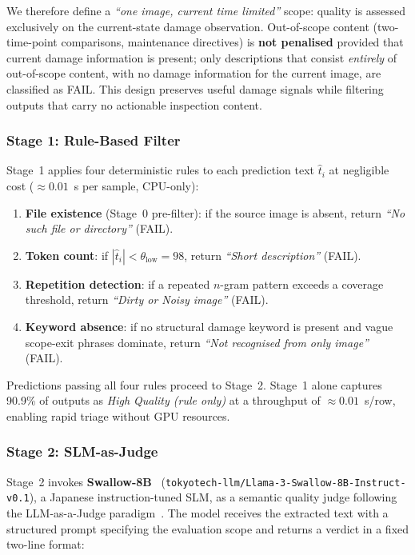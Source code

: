 \documentclass[twocolumn]{article}
\begin{document}
We therefore define a \textit{``one image, current time limited''} scope:
quality is assessed exclusively on the current-state damage observation.
Out-of-scope content (two-time-point comparisons, maintenance directives)
is \textbf{not penalised} provided that current damage information is present;
only descriptions that consist \textit{entirely} of out-of-scope content,
with no damage information for the current image, are classified as FAIL.
This design preserves useful damage signals while filtering outputs that
carry no actionable inspection content.

\subsubsection{Stage 1: Rule-Based Filter}
\label{sec:guard_stage1}

Stage~1 applies four deterministic rules to each prediction text $\hat{t}_i$
at negligible cost (${\approx}0.01$~s per sample, CPU-only):

\begin{enumerate}[leftmargin=*,itemsep=1pt]
  \item \textbf{File existence} (Stage~0 pre-filter): if the source image is
        absent, return \textit{``No such file or directory''} (FAIL).
  \item \textbf{Token count}: if $|\hat{t}_i| < \theta_{\text{low}} = 98$,
        return \textit{``Short description''} (FAIL).
  \item \textbf{Repetition detection}: if a repeated $n$-gram pattern exceeds
        a coverage threshold, return \textit{``Dirty or Noisy image''} (FAIL).
  \item \textbf{Keyword absence}: if no structural damage keyword is present
        and vague scope-exit phrases dominate, return
        \textit{``Not recognised from only image''} (FAIL).
\end{enumerate}

Predictions passing all four rules proceed to Stage~2.
Stage~1 alone captures 90.9\% of outputs as \textit{High Quality (rule only)}
at a throughput of ${\approx}0.01$~s/row, enabling rapid triage without GPU
resources.

\subsubsection{Stage 2: SLM-as-Judge}
\label{sec:guard_stage2}

Stage~2 invokes \textbf{Swallow-8B}~\cite{tokyotech2024swallow}
(\texttt{tokyotech-llm/Llama-3-Swallow-8B-Instruct-v0.1}),
a Japanese instruction-tuned SLM, as a semantic quality judge following
the LLM-as-a-Judge paradigm~\cite{zheng2023judge}.
The model receives the extracted text with a structured prompt specifying
the evaluation scope and returns a verdict in a fixed two-line format:
\end{document}
